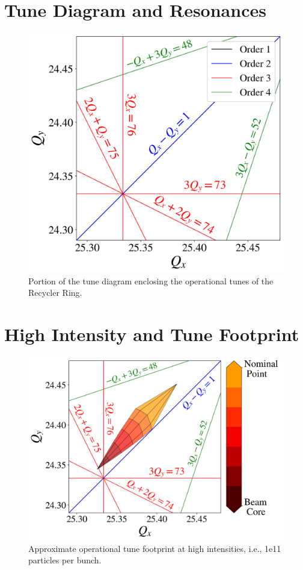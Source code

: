\section{Tune Diagram and Resonances}

\begin{figure}[H]
   \centering
   \includegraphics[width=\columnwidth]{chapter3/rrtd.png}
   \caption{Portion of the tune diagram enclosing the operational tunes of the Recycler Ring.}
   \label{fig:rrtd}
\end{figure}

\section{High Intensity and Tune Footprint}

\begin{figure}[H]
   \centering
   \includegraphics[width=\columnwidth]{chapter3/rrtdhigh.png}
   \caption{Approximate operational tune footprint at high intensities, i.e., 1e11 particles per bunch.}
   \label{fig:rrtdhigh}
\end{figure}